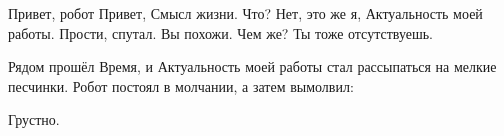 \begin{dialog}
\X Привет, робот
\R Привет, Смысл жизни.
\X Что? Нет, это же я, Актуальность моей работы.
\R Прости, спутал. Вы похожи.
\X Чем же?
\R Ты тоже отсутствуешь.
\end{dialog}

\begin{monolog}
Рядом прошёл Время, и Актуальность моей работы стал рассыпаться на мелкие песчинки. Робот постоял в молчании, а затем вымолвил:
\end{monolog}

\begin{dialog}
\R Грустно.
\end{dialog}
